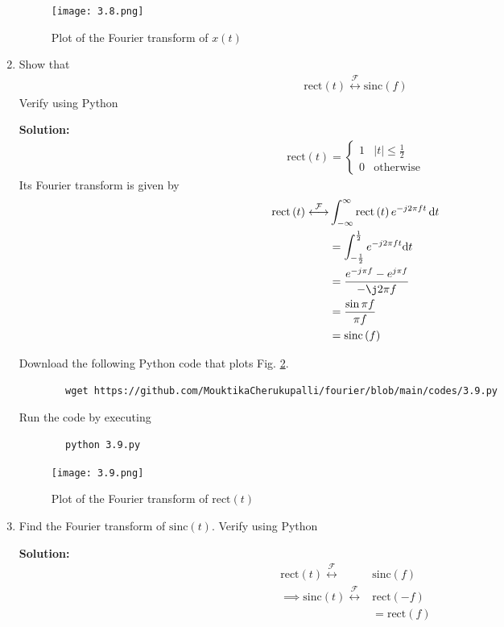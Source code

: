 \documentclass[journal,12pt,twocolumn]{IEEEtran}
\newcommand{\solution}{\noindent \textbf{Solution: }}
\providecommand{\der}[1]{\mathrm{d} #1}
\providecommand{\abs}[1]{\left\vert#1\right\vert}
\providecommand{\system}[1]{\overset{\mathcal{#1}}{ \longleftrightarrow}}
\providecommand{\rect}[1]{\mathrm{rect}\ensuremath{\left(#1\right)}}
\providecommand{\sinc}[1]{\mathrm{sinc}\ensuremath{\left(#1\right)}}
\numberwithin{equation}{section}
\numberwithin{figure}{section}
\renewcommand\thesection{\arabic{section}}
\begin{document}
\begin{enumerate}[label=\thesection.\arabic*,ref=\thesection.\theenumi]
	\begin{figure}[!ht]
		\centering
		\texttt{[image: 3.8.png]}
		\caption{Plot of the Fourier transform of $x(t)$}
		\label{fig-2.3}	
	\end{figure}
	
	 \item Show that 
	 \begin{align}
		 \rect{t} \system{F} \sinc{f}
 	\end{align}
 	Verify using Python
 	
 	\solution
 	\begin{align}
 		\rect{t} = 
 		\begin{cases}
 			1 & \abs{t} \le \frac{1}{2} \\
 			0 & \text{otherwise}
 		\end{cases}
 	\end{align}
 	Its Fourier transform is given by
 	\begin{align}
 		\rect{t} \system{F} &\int_{-\infty}^{\infty}\rect{t}e^{-j2\pi ft}\,\der{t} \\
 		&= \int_{-\frac{1}{2}}^{\frac{1}{2}} e^{-j2 \pi ft} \der{t} \\
 		&= \frac{e^{-j \pi f} - e^{j \pi f}  }{-\j2 \pi f} \\
 		&= \frac{\sin\pi f}{\pi f} \\
 		&= \sinc{f}
 	\end{align}
 	
 	Download the following Python code that plots Fig. \ref{fig-3.9}.
	\begin{lstlisting}
		wget https://github.com/MouktikaCherukupalli/fourier/blob/main/codes/3.9.py
	\end{lstlisting}
	
	Run the code by executing
	\begin{lstlisting}
		python 3.9.py
	\end{lstlisting}

	\begin{figure}[!ht]
		\centering
		\texttt{[image: 3.9.png]}
		\caption{Plot of the Fourier transform of $\rect{t}$}
		\label{fig-3.9}	
	\end{figure}
	
	\item Find the Fourier transform of $\sinc{t}$. Verify using Python
	
	\solution 
	\begin{align}
		\rect{t} \system{F} &\sinc{f} \\
		\implies \sinc{t} \system{F} &\rect{-f} \\
		&= \rect{f}
	\end{align}
	

\end{enumerate}
\end{document}
